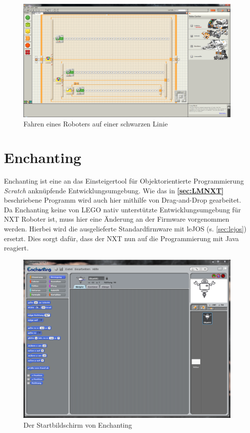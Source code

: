 \documentclass[paper=a4, DIV=calc, BCOR=15mm, twoside=on, onecolumn=on, open = right, titlepage =on, parskip =half, headsepline = on, footsepline = on, chapterprefix = off, appendixprefix = off, fontsize = 12pt, numbers = noenddot, abstract = on]{scrbook}
\begin{document}
\begin{figure}[htbp]
\centering
\includegraphics[width=\textwidth]{images/Beispielprogramm_NXT.png} 
\caption{Fahren eines Roboters auf einer schwarzen Linie}
\label{fig:Bsp NXT}
\end{figure}

\vspace*{2ex}
\section{Enchanting}
\label{sec:enchanting}
Enchanting ist eine an das Einsteigertool für Objektorientierte Programmierung \emph{Scratch} anknüpfende Entwicklungsumgebung. Wie das in \textbf{\ref{sec:LMNXT}} beschriebene Programm wird auch hier mithilfe von Drag-and-Drop gearbeitet. Da Enchanting keine von LEGO nativ unterstützte Entwicklungsumgebung für NXT Roboter ist, muss hier eine Änderung an der Firmware vorgenommen werden. Hierbei wird die ausgelieferte Standardfirmware mit leJOS (s. \ref{sec:lejos}) ersetzt. Dies sorgt dafür, dass der NXT nun auf die Programmierung mit Java reagiert.


\begin{figure}[htbp]
\centering
\includegraphics[width=\textwidth]{images/Enchanting_Start.png} 
\caption{Der Startbildschirm von Enchanting}
\label{fig:Enchanting Start}
\end{figure}
\end{document}
